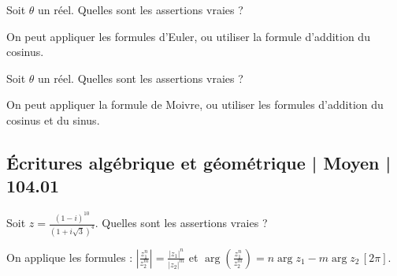 \begin{question} 
Soit $\theta$ un réel.  Quelles sont les assertions vraies ?
\begin{answers}


\end{answers}
\begin{explanations}
On peut appliquer les formules d'Euler, ou utiliser la formule d'addition du cosinus. 

\end{explanations}

\end{question}


\begin{question} 
Soit $\theta$ un réel.  Quelles sont les assertions vraies ?
\begin{answers}
    \bad{$\cos(2\theta)= 2\cos\theta \sin \theta$}
    \good{ $\cos(2\theta)= \cos^2\theta -\sin^2 \theta$}

    \good{$\sin(2\theta)= 2\cos\theta \sin \theta$}

    \bad{$\sin(2\theta)= \cos^2\theta -\sin^2 \theta$}
\end{answers}
\begin{explanations}
On peut appliquer la formule de Moivre, ou utiliser les formules d'addition du cosinus et du sinus. 

\end{explanations}

\end{question}

\subsection{Écritures algébrique et géométrique | Moyen | 104.01}

\begin{question} 
Soit $z=\frac{(1-i)^{10}}{(1+i\sqrt 3)^4}$. Quelles sont les assertions vraies ?
\begin{answers}
    



 
\end{answers}
\begin{explanations}
On applique les formules :
$|\frac{z_1^n}{z_2^m}|= \frac{|z_1|^n}{|z_2|^m}$   et $\arg(\frac{z_1^n}{z_2^m})= n\arg z_1 - m\arg z_2 \, [2\pi]$. 
\end{explanations}

\end{question}






